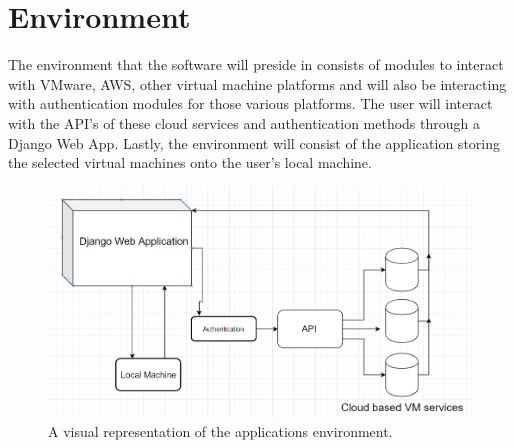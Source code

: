 \documentclass{article}
\begin{document}
    \section{Environment}

    The environment that the software will preside in consists of modules to interact with VMware, 
    AWS, other virtual machine platforms and will also be interacting with authentication modules for those
    various platforms. The user will interact with the API's of these cloud services and authentication
    methods through a Django Web App. Lastly, the environment will consist of the application storing the selected
    virtual machines onto the user's local machine.

    \begin{figure}[h]
    \includegraphics[scale=.7]{diagram}
        \caption{A visual representation of the applications environment.}
    \end{figure}
\end{document}
